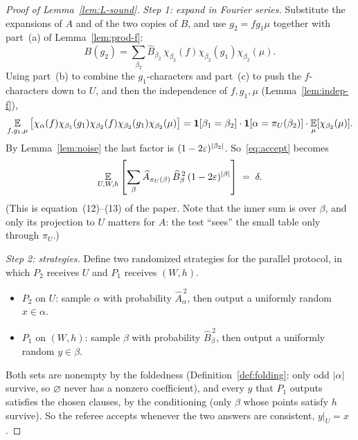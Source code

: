 \begin{proof}[Proof of Lemma~\ref{lem:L-sound}]
\emph{Step 1: expand in Fourier series.}  Substitute the expansions of $A$ and of the two copies of $B$, and use $g_2=fg_1\mu$ together with part~(a) of Lemma~\ref{lem:prod-f}:
\[
  B(g_2)=\sum_{\beta_2}\widehat B_{\beta_2}\,\chi_{\beta_2}(f)\chi_{\beta_2}(g_1)\chi_{\beta_2}(\mu).
\]
Using part~(b) to combine the $g_1$-characters and part~(c) to push the $f$-characters down to $U$, and then the independence of $f,g_1,\mu$ (Lemma~\ref{lem:indep-f}),
\[
  \operatorname*{\mathbb{E}}_{f,g_1,\mu}\big[\chi_{\alpha}(f)\chi_{\beta_1}(g_1)\chi_{\beta_2}(f)\chi_{\beta_2}(g_1)\chi_{\beta_2}(\mu)\big]
  =\mathbf 1[\beta_1=\beta_2]\cdot\mathbf 1[\alpha=\pi_U(\beta_2)]\cdot\operatorname*{\mathbb{E}}_\mu[\chi_{\beta_2}(\mu)] .
\]
By Lemma~\ref{lem:noise} the last factor is $(1-2\varepsilon)^{|\beta_2|}$.  So~\eqref{eq:accept} becomes
\begin{equation}\label{eq:dsquared}
  \operatorname*{\mathbb{E}}_{U,W,h}\left[\sum_{\beta}\widehat A_{\pi_U(\beta)}\,\widehat B_\beta^{\,2}\,(1-2\varepsilon)^{|\beta|}\right]\;=\;\delta .
\end{equation}
(This is equation~(12)--(13) of the paper.  Note that the inner sum is over $\beta$, and only its projection to $U$ matters for $A$: the test ``sees'' the small table only through $\pi_U$.)

\emph{Step 2: strategies.}  Define two randomized strategies for the parallel protocol, in which $P_2$ receives $U$ and $P_1$ receives $(W,h)$.
\begin{itemize}
  \item $P_2$ on $U$: sample $\alpha$ with probability $\widehat A_\alpha^{\,2}$, then output a uniformly random $x\in\alpha$.
  \item $P_1$ on $(W,h)$: sample $\beta$ with probability $\widehat B_\beta^{\,2}$, then output a uniformly random $y\in\beta$.
\end{itemize}
Both sets are nonempty by the foldedness (Definition~\ref{def:folding}: only odd $|\alpha|$ survive, so $\varnothing$ never has a nonzero coefficient), and every $y$ that $P_1$ outputs satisfies the chosen clauses, by the conditioning (only $\beta$ whose points satisfy $h$ survive).  So the referee accepts whenever the two answers are consistent, $y|_U=x$.


\end{proof}
